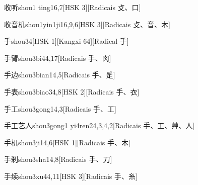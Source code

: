 \begin{entry}{收听}{shou1 ting1}{6,7}[HSK 3][Radicais ⽁、⼝]
\end{entry}

\begin{entry}{收音机}{shou1yin1ji1}{6,9,6}[HSK 3][Radicais ⽁、⾳、⽊]
\end{entry}

\begin{entry}{手}{shou3}{4}[HSK 1][Kangxi 64][Radical ⼿]
\end{entry}

\begin{entry}{手臂}{shou3bi4}{4,17}[Radicais ⼿、⾁]
\end{entry}

\begin{entry}{手边}{shou3bian1}{4,5}[Radicais ⼿、⾡]
\end{entry}

\begin{entry}{手表}{shou3biao3}{4,8}[HSK 2][Radicais ⼿、⾐]
\end{entry}

\begin{entry}{手工}{shou3gong1}{4,3}[Radicais ⼿、⼯]
\end{entry}

\begin{entry}{手工艺人}{shou3gong1 yi4ren2}{4,3,4,2}[Radicais ⼿、⼯、⾋、⼈]
\end{entry}

\begin{entry}{手机}{shou3ji1}{4,6}[HSK 1][Radicais ⼿、⽊]
\end{entry}

\begin{entry}{手刹}{shou3sha1}{4,8}[Radicais ⼿、⼑]
\end{entry}

\begin{entry}{手续}{shou3xu4}{4,11}[HSK 3][Radicais ⼿、⽷]
\end{entry}

